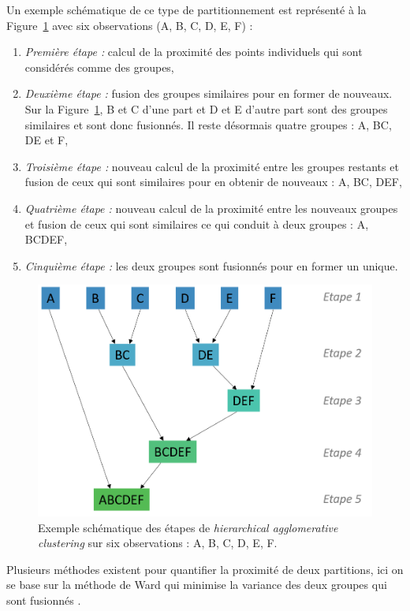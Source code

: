 Un exemple schématique de ce type de partitionnement est représenté à la Figure~\ref{Figure:tbr_hierarchical_agglomerative_clustering_example} avec six observations (A, B, C, D, E, F) :
\begin{enumerate}
\item \emph{Première étape :} calcul de la proximité des points individuels qui sont considérés comme des groupes,
\item \emph{Deuxième étape :} fusion des groupes similaires pour en former de nouveaux. Sur la Figure~\ref{Figure:tbr_hierarchical_agglomerative_clustering_example}, B et C d'une part et D et E
d'autre part sont des groupes similaires et sont donc fusionnés. Il reste désormais quatre groupes : A, BC, DE et F,
\item \emph{Troisième étape :} nouveau calcul de la proximité entre les groupes restants et fusion de ceux qui sont similaires pour en obtenir de nouveaux : A, BC, DEF,
\item \emph{Quatrième étape :} nouveau calcul de la proximité entre les nouveaux groupes et fusion de ceux qui sont similaires ce qui conduit à deux groupes : A, BCDEF,
\item \emph{Cinquième étape :} les deux groupes sont fusionnés pour en former un unique.
\end{enumerate}

\begin{figure}[h!]
  \centering
	\includegraphics[width=0.7\linewidth]{figures/chapter-4/tbr-hierarchical-agglomerative-clustering-example} 
  \caption[Exemple schématique des étapes de \textit{hierarchical agglomerative clustering}.]{Exemple schématique des étapes de \textit{hierarchical agglomerative clustering} sur six observations : A, B, C, D, E, F.} 
	\label{Figure:tbr_hierarchical_agglomerative_clustering_example} 
\end{figure}

Plusieurs méthodes existent pour quantifier la proximité de deux partitions, ici on se base sur la méthode de Ward qui minimise 
la variance des deux groupes qui sont fusionnés \citep{Ward1963}.

